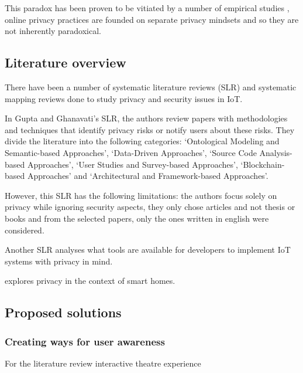 \documentclass[conference]{IEEEtran}
\begin{document}
This paradox has been proven to be vitiated by a number of empirical studies \cite{dienlin2015privacy, xie2019consumers, SCHWAIG20131, sannon2018privacy},
online privacy practices are founded on separate privacy mindsets and so they are not inherently paradoxical.

\subsection{Literature overview}

There have been a number of systematic literature reviews (SLR) \cite{shi2020applications, atlam2020iot, LoukilPrivacy, SICARI2015146, vcolakovic2018internet, chitanya2018robustness, chanal2020security, LinSurvey, Kraijaksurvey}
and systematic mapping reviews \cite{porras2018security, ahmed2019aspects}
done to study privacy and security issues in IoT.

In Gupta and Ghanavati's \cite{Gupta2022Privacy} SLR,
the authors review papers with methodologies and techniques that identify
privacy risks or notify users about these risks. They divide the literature
into the following categories: `Ontological Modeling and Semantic-based Approaches',
`Data-Driven Approaches', `Source Code Analysis-based Approaches', `User Studies
and Survey-based Approaches', `Blockchain-based Approaches' and `Architectural
and Framework-based Approaches'.




However, this SLR has the following limitations:
the authors focus solely on privacy while ignoring security aspects, they only
chose articles and not thesis or books and from the selected papers, only the
ones written in english were considered.

Another SLR \cite{Kuhtreiber2022survey} analyses what tools are available for
developers to implement IoT systems with privacy in mind.

\cite{AbbottPrivacy} explores privacy in the context of smart homes.

\subsection{Proposed solutions}

\subsubsection{Creating ways for user awareness}

For the literature review interactive theatre experience \cite{SkirpanPrivacy}
\end{document}
